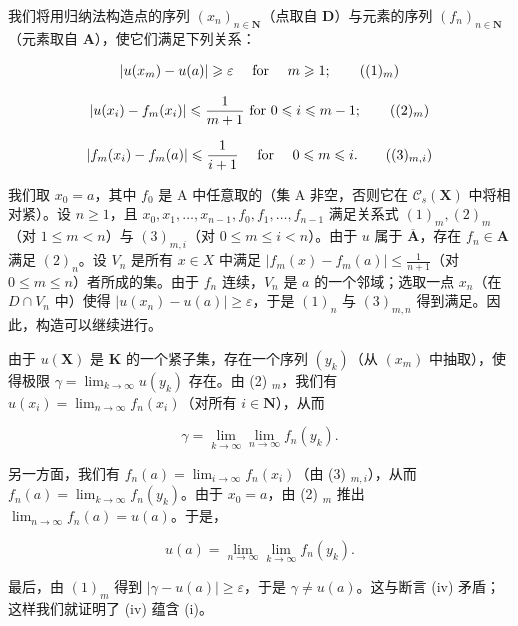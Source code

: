我们将用归纳法构造点的序列 \((x_{n})_{n\in \mathbf{N}}\)（点取自 \(\mathbf{D}\)）与元素的序列 \((f_n)_{n\in \mathbf{N}}\)（元素取自 \(\mathbf{A}\)），使它们满足下列关系：

\[
\left| u (x _ {m}) - u (a) \right| \geqslant \varepsilon \quad \text { for } \quad m \geqslant 1;\tag{$(1)_{m}$}
\]

\[
\left| u (x _ {i}) - f _ {m} (x _ {i}) \right| \leqslant \frac {1}{m + 1} \text { for } 0 \leqslant i \leqslant m - 1;\tag{$(2)_{m}$}
\]

\[
\left| f _ {m} (x _ {i}) - f _ {m} (a) \right| \leqslant \frac {1}{i + 1} \quad \text { for } \quad 0 \leqslant m \leqslant i.\tag{$(3)_{m,i}$}
\]

我们取 \(x_0 = a\)，其中 \(f_0\) 是 A 中任意取的（集 A 非空，否则它在 \(\mathcal{C}_s(\mathbf{X})\) 中将相对紧）。设 \(n \geqslant 1\)，且 \(x_0, x_1, \ldots, x_{n-1}, f_0, f_1, \ldots, f_{n-1}\) 满足关系式 \((1)_m, (2)_m\)（对 \(1 \leqslant m < n\)）与 \((3)_{m,i}\)（对 \(0 \leqslant m \leqslant i < n\)）。由于 \(u\) 属于 \(\overline{\mathbf{A}}\)，存在 \(f_n \in \mathbf{A}\) 满足 \((2)_n\)。设 \(V_n\) 是所有 \(x \in X\) 中满足 \(|f_m(x) - f_m(a)| \leqslant \frac{1}{n+1}\)（对 \(0 \leqslant m \leqslant n\)）者所成的集。由于 \(f_n\) 连续，\(V_n\) 是 \(a\) 的一个邻域；选取一点 \(x_n\)（在 \(D \cap V_n\) 中）使得 \(|u(x_n) - u(a)| \geqslant \varepsilon\)，于是 \((1)_n\) 与 \((3)_{m,n}\) 得到满足。因此，构造可以继续进行。

由于 \(u(\mathbf{X})\) 是 \(\mathbf{K}\) 的一个紧子集，存在一个序列 \((y_k)\)（从 \((x_m)\) 中抽取），使得极限 \(\gamma = \lim_{k\to \infty}u(y_k)\) 存在。由 (2) \(_m\)，我们有 \(u(x_i) = \lim_{n\to \infty}f_n(x_i)\)（对所有 \(i\in \mathbf{N}\)），从而

\[
\gamma = \lim _ {k \rightarrow \infty} \lim _ {n \rightarrow \infty} f _ {n} (y _ {k}).\tag{4}
\]

另一方面，我们有 \(f_{n}(a) = \lim_{i\to \infty}f_{n}(x_{i})\)（由 (3) \(_{m,i}\)），从而 \(f_{n}(a) = \lim_{k\to \infty}f_{n}(y_{k})\)。由于 \(x_0 = a\)，由 (2) \(_{m}\) 推出 \(\lim_{n\to \infty}f_n(a) = u(a)\)。于是，

\[
u (a) = \lim _ {n \rightarrow \infty} \lim _ {k \rightarrow \infty} f _ {n} (y _ {k}).\tag{5}
\]

最后，由 \((1)_{m}\) 得到 \(|\gamma - u(a)| \geqslant \varepsilon\)，于是 \(\gamma \neq u(a)\)。这与断言 (iv) 矛盾；这样我们就证明了 (iv) 蕴含 (i)。

